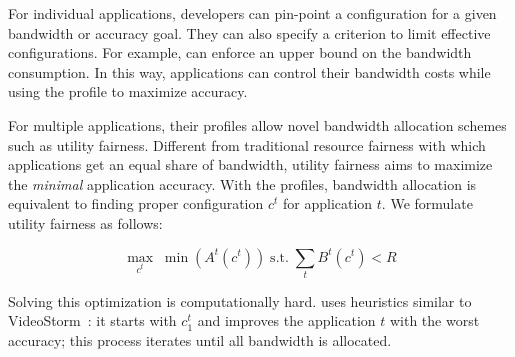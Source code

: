 For individual applications, developers can pin-point a configuration for a
given bandwidth or accuracy goal. They can also specify a criterion to limit
effective configurations. For example, \sysname{} can enforce an upper bound on
the bandwidth consumption. In this way, applications can control their bandwidth
costs while using the profile to maximize accuracy.

For multiple applications, their profiles allow novel bandwidth allocation
schemes such as utility fairness. Different from traditional resource fairness
with which applications get an equal share of bandwidth, utility fairness aims
to maximize the \textit{minimal} application accuracy. With the profiles,
bandwidth allocation is equivalent to finding proper configuration $c^t$ for
application $t$. We formulate utility fairness as follows:


\begin{equation}
 \label{eq:multitask}
 \underset{c^t}{\max} \; \min({A^t(c^t)})
 \;
 \text{s.t.}
 \;
 \sum_t{B^t(c^t)} < R
\end{equation}


Solving this optimization is computationally hard. \sysname{} uses heuristics
similar to VideoStorm~\cite{zhang2017live}: it starts with $c^t_1$ and improves
the application $t$ with the worst accuracy; this process iterates until all
bandwidth is allocated.


